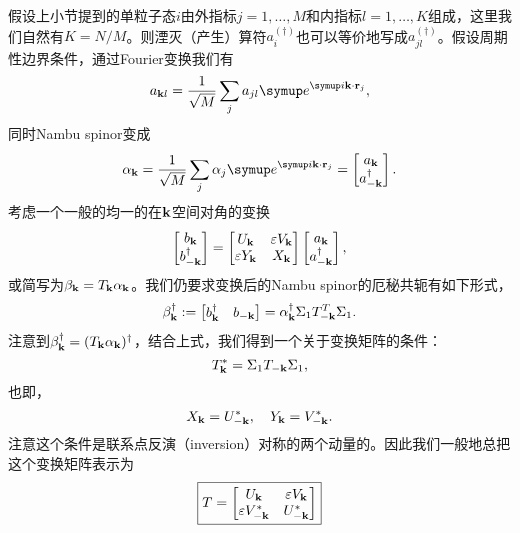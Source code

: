 假设上小节提到的单粒子态$i$由外指标$j=1,\dots,M$和内指标$l=1,\dots,K$组成，这里我们自然有$K=N/M$。则湮灭（产生）算符$a_i^{(\dagger)}$也可以等价地写成$a_{jl}^{(\dagger)}$。假设周期性边界条件，通过Fourier变换我们有
\begin{equation}
  a_{\vb{k} l }= \frac{1}{\sqrt{M}} \sum_j a_{jl} \eu^{\iu \vb{k} \cdot \vb{r}_j },
\end{equation}
同时Nambu spinor变成
\begin{equation}
  \alpha_{\vb k} = \frac{1}{\sqrt{M}} \sum_{j} \alpha_j \eu^{\iu \vb k\cdot \vb r_j}=\begin{bmatrix}
      a_{\vb k}\\
      a^\dagger_{-\vb k}
  \end{bmatrix}.
\end{equation}
考虑一个一般的均一的在$\vb k$空间对角的变换
\begin{equation}
  \begin{bmatrix}
      b_{\vb k}\\
      b^\dagger_{-\vb k}
  \end{bmatrix}=\begin{bmatrix}
      U_{\vb k} & \varepsilon V_{\vb k}\\
      \varepsilon Y_{\vb k} & X_{\vb k}
  \end{bmatrix}\begin{bmatrix}
a_{\vb k}\\
a^\dagger_{-\vb k}
\end{bmatrix},
\end{equation}
或简写为$\beta_{\vb k} = T_{\vb k}\alpha_{\vb k}$。我们仍要求变换后的Nambu spinor的厄秘共轭有如下形式，
\begin{equation}
  \beta^\dagger_{\vb k} := \begin{bmatrix}
      b_{\vb k}^\dagger & b_{-\vb k}
  \end{bmatrix}=\alpha_{\vb k}^\dagger \Sigma_1 T^T_{-\vb k} \Sigma_1.
\end{equation}
注意到$\beta^\dagger_{\vb k}=(T_{\vb k}\alpha_{\vb k})^\dagger$，结合上式，我们得到一个关于变换矩阵的条件：
\begin{equation}
  T^*_{\vb k}=\Sigma_1 T_{-\vb k} \Sigma_1,\label{her1}
\end{equation}
也即，
\begin{equation}
  X_{\vb k}=U^*_{-\vb k},\quad Y_{\vb k}=V^*_{-\vb k}.
\end{equation}
注意这个条件是联系点反演（inversion）对称的两个动量的。因此我们一般地总把这个变换矩阵表示为
\begin{equation}
  \boxed{
  T=\begin{bmatrix}
      U_{\vb k} & \varepsilon V_{\vb k}\\
      \varepsilon V_{-\vb k}^* & U_{-\vb k}^*
  \end{bmatrix}}
\end{equation}

